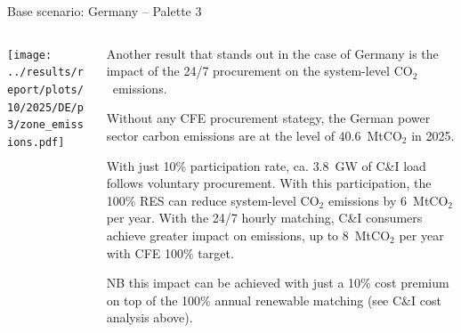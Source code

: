 \begin{frame}{Base scenario: Germany -- Palette 3}

  {\footnotesize
  \vspace{0.1cm}
  
  \begin{columns}[T]
  \begin{column}{9cm}
  \centering
  
  \texttt{[image: ../results/report/plots/10/2025/DE/p3/zone\_emissions.pdf]}
  
  \end{column}
  \begin{column}{6cm}
  
  \vspace{0.1cm}
  Another result that stands out in the case of Germany is the
  impact of the 24/7 procurement on the system-level CO$_2$~emissions. 
  
  \vspace{0.1cm}
  Without any CFE procurement stategy, 
  the German power sector carbon emissions are at the level of 
  40.6~MtCO$_2$ in 2025.
  
  \vspace{0.1cm}
  With just 10\% participation rate, ca. \alert{3.8~GW} of C\&I load 
  follows voluntary procurement. 
  With this participation, the 100\% RES can reduce system-level 
  CO$_2$ emissions by \alert{6~MtCO$_2$} per year.
  With the 24/7 hourly matching, C\&I consumers  
  achieve greater impact on emissions, up to \alert{8~MtCO$_2$} per year
  with CFE 100\% target.

  \vspace{0.1cm}
  NB this impact can be achieved with just a \alert{10\% cost premium}
  on top of the 100\% annual renewable matching (see C\&I cost analysis above).

  \end{column}
  \end{columns}
  }
\end{frame}



